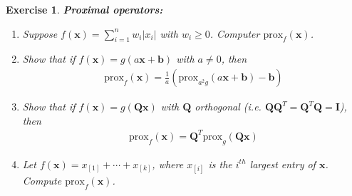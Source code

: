 \documentclass[12pt]{article}
\theoremstyle{colon}
\newtheorem{exercise}{Exercise}
\begin{document}
\begin{exercise}

	\textbf{Proximal operators:}

	\begin{enumerate}[label=\alph*)]
		\item Suppose $f(\bm{x}) = \sum_{i=1}^n w_i \lvert x_i \rvert$ with $w_i \geq 0$. Computer $\text{prox}_f(\bm{x})$.

		\item Show that if $f(\bm{x}) = g(a \bm{x} + \bm{b})$ with $a \neq 0$, then
			\begin{gather*}
				\text{prox}_f(\bm{x}) = \frac{1}{a} ( \text{prox}_{a^2 g} (a \bm{x} + \bm{b}) - \bm{b})
			\end{gather*}

		\item Show that if $f(\bm{x}) = g(\bm{Q} \bm{x})$ with $\bm{Q}$ orthogonal (i.e. $\bm{Q} \bm{Q}^T = \bm{Q}^T \bm{Q} = \bm{I}$), then
			\begin{gather*}
				\text{prox}_f(\bm{x}) = \bm{Q}^T \text{prox}_g (\bm{Q} \bm{x})
			\end{gather*}

		\item Let $f(\bm{x}) = x_{[1]} + \cdots + x_{[k]}$, where $x_{[i]}$ is the $i^{th}$ largest entry of $\bm{x}$. Compute $\text{prox}_f (\bm{x})$.
	\end{enumerate}

\end{exercise}
\end{document}
